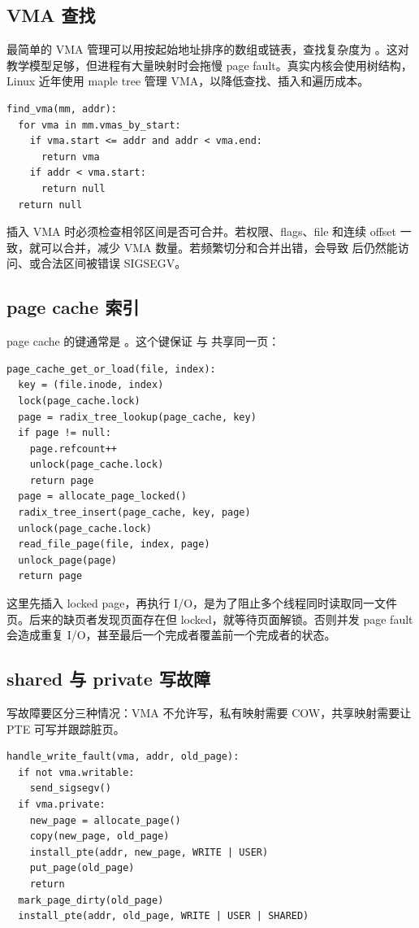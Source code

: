 \subsection{VMA 查找}

最简单的 VMA 管理可以用按起始地址排序的数组或链表，查找复杂度为 。这对教学模型足够，但进程有大量映射时会拖慢 page fault。真实内核会使用树结构，Linux 近年使用 maple tree 管理 VMA，以降低查找、插入和遍历成本。

\begin{lstlisting}
find_vma(mm, addr):
  for vma in mm.vmas_by_start:
    if vma.start <= addr and addr < vma.end:
      return vma
    if addr < vma.start:
      return null
  return null
\end{lstlisting}

插入 VMA 时必须检查相邻区间是否可合并。若权限、flags、file 和连续 offset 一致，就可以合并，减少 VMA 数量。若频繁切分和合并出错，会导致  后仍然能访问、或合法区间被错误 SIGSEGV。

\subsection{page cache 索引}

page cache 的键通常是 。这个键保证  与  共享同一页：

\begin{lstlisting}
page_cache_get_or_load(file, index):
  key = (file.inode, index)
  lock(page_cache.lock)
  page = radix_tree_lookup(page_cache, key)
  if page != null:
    page.refcount++
    unlock(page_cache.lock)
    return page
  page = allocate_page_locked()
  radix_tree_insert(page_cache, key, page)
  unlock(page_cache.lock)
  read_file_page(file, index, page)
  unlock_page(page)
  return page
\end{lstlisting}

这里先插入 locked page，再执行 I/O，是为了阻止多个线程同时读取同一文件页。后来的缺页者发现页面存在但 locked，就等待页面解锁。否则并发 page fault 会造成重复 I/O，甚至最后一个完成者覆盖前一个完成者的状态。

\subsection{shared 与 private 写故障}

写故障要区分三种情况：VMA 不允许写，私有映射需要 COW，共享映射需要让 PTE 可写并跟踪脏页。

\begin{lstlisting}
handle_write_fault(vma, addr, old_page):
  if not vma.writable:
    send_sigsegv()
  if vma.private:
    new_page = allocate_page()
    copy(new_page, old_page)
    install_pte(addr, new_page, WRITE | USER)
    put_page(old_page)
    return
  mark_page_dirty(old_page)
  install_pte(addr, old_page, WRITE | USER | SHARED)
\end{lstlisting}

